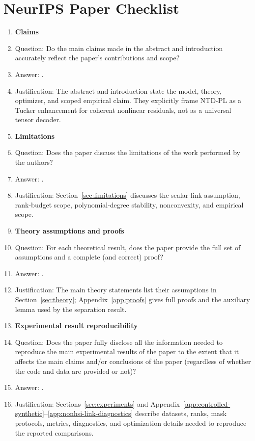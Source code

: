 \section*{NeurIPS Paper Checklist}

\begin{enumerate}

\item {\bf Claims}
    \item[] Question: Do the main claims made in the abstract and introduction accurately reflect the paper's contributions and scope?
    \item[] Answer: \answerYes{}.
    \item[] Justification: The abstract and introduction state the model, theory, optimizer, and scoped empirical claim. They explicitly frame NTD-PL as a Tucker enhancement for coherent nonlinear residuals, not as a universal tensor decoder.

\item {\bf Limitations}
    \item[] Question: Does the paper discuss the limitations of the work performed by the authors?
    \item[] Answer: \answerYes{}.
    \item[] Justification: Section~\ref{sec:limitations} discusses the scalar-link assumption, rank-budget scope, polynomial-degree stability, nonconvexity, and empirical scope.

\item {\bf Theory assumptions and proofs}
    \item[] Question: For each theoretical result, does the paper provide the full set of assumptions and a complete (and correct) proof?
    \item[] Answer: \answerYes{}.
    \item[] Justification: The main theory statements list their assumptions in Section~\ref{sec:theory}; Appendix~\ref{app:proofs} gives full proofs and the auxiliary lemma used by the separation result.

\item {\bf Experimental result reproducibility}
    \item[] Question: Does the paper fully disclose all the information needed to reproduce the main experimental results of the paper to the extent that it affects the main claims and/or conclusions of the paper (regardless of whether the code and data are provided or not)?
    \item[] Answer: \answerYes{}.
    \item[] Justification: Sections~\ref{sec:experiments} and Appendix~\ref{app:controlled-synthetic}--\ref{app:nonhsi-link-diagnostics} describe datasets, ranks, mask protocols, metrics, diagnostics, and optimization details needed to reproduce the reported comparisons.


\end{enumerate}

